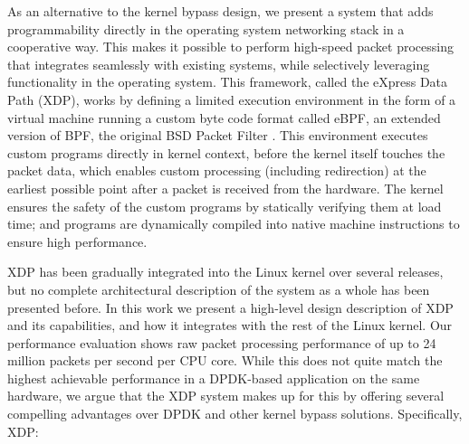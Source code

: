 \documentclass[sigconf]{acmart}
\begin{document}
As an alternative to the kernel bypass design, we present a system that adds
programmability directly in the operating system networking stack in a
cooperative way. This makes it possible to perform high-speed packet processing
that integrates seamlessly with existing systems, while selectively leveraging
functionality in the operating system. This framework, called the eXpress Data
Path (XDP), works by defining a limited execution environment in the form of a
virtual machine running a custom byte code format called eBPF, an extended
version of BPF, the original BSD Packet Filter \cite{mccanne_bsd_1993}. This
environment executes custom programs directly in kernel context, before the
kernel itself touches the packet data, which enables custom processing
(including redirection) at the earliest possible point after a packet is
received from the hardware. The kernel ensures the safety of the custom programs
by statically verifying them at load time; and programs are dynamically compiled
into native machine instructions to ensure high performance.

XDP has been gradually integrated into the Linux kernel over several releases,
but no complete architectural description of the system as a whole has been
presented before. In this work we present a high-level design description of XDP
and its capabilities, and how it integrates with the rest of the Linux kernel.
Our performance evaluation shows raw packet processing performance of up to 24
million packets per second per CPU core. While this does not quite match the
highest achievable performance in a DPDK-based application on the same hardware,
we argue that the XDP system makes up for this by offering several compelling
advantages over DPDK and other kernel bypass solutions. Specifically, XDP:
\end{document}
